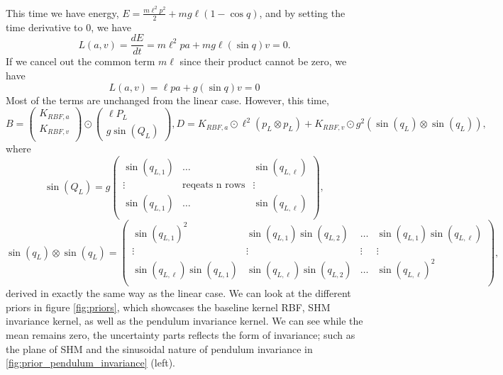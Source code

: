 \documentclass{statsmsc}
\begin{document}
This time we have energy, $E=\frac{m\ell^2p^2}{2}+mg\ell(1-\cos q)$, and by setting the time derivative to 0, we have 
$$L(a, v)=\frac{dE}{dt}=m\ell^2pa+mg\ell(\sin q)v=0.$$
If we cancel out the common term $m\ell$ since their product cannot be zero, we have $$L(a,v)=\ell pa+g(\sin q)v=0$$
Most of the terms are unchanged from the linear case. 
However, this time, 
$$
B=\begin{pmatrix}
    K_{RBF,a} \\ K_{RBF,v} \\
\end{pmatrix}\odot \begin{pmatrix}
    \ell P_L \\ g\sin(Q_L)
\end{pmatrix}, D=K_{RBF,a}\odot \ell^2(p_L\otimes p_L) + K_{RBF,v}\odot g^2(\sin(q_L)\otimes \sin(q_L)),
$$
where 
$$
\sin(Q_L) = g\begin{pmatrix}
  \sin(q_{L,1})  & \dots & \sin(q_{L,\ell})  \\
  \vdots & \text{reqeats n rows} &  \vdots\\
  \sin(q_{L,1})  & \dots & \sin(q_{L,\ell})  \\
\end{pmatrix},
$$
$$
\sin(q_L)\otimes \sin(q_L)=\begin{pmatrix}
  \sin(q_{L,1})^2 & \sin(q_{L,1})\sin(q_{L,2}) & \dots & \sin(q_{L,1})\sin(q_{L,\ell}) \\
  \vdots & \vdots & \vdots & \vdots \\
  \sin(q_{L,\ell})\sin(q_{L,1}) & \sin(q_{L,\ell})\sin(q_{L,2}) & \dots & \sin(q_{L,\ell})^2 \\
\end{pmatrix},
$$
derived in exactly the same way as the linear case. 
We can look at the different priors in figure \ref{fig:priors}, which showcases the baseline kernel RBF, SHM invariance kernel, as well as the pendulum invariance kernel.
We can see while the mean remains zero, the uncertainty parts reflects the form of invariance; such as the plane of SHM and the sinusoidal nature of pendulum invariance in \ref{fig:prior_pendulum_invariance} (left).
\end{document}
